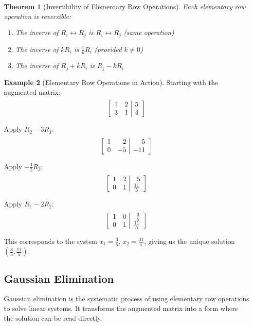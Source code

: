 \documentclass[12pt]{article}
\numberwithin{equation}{section}
\newenvironment{amatrix}[1]{%
  \left[\begin{array}{#1}}
  {\end{array}\right]}
\theoremstyle{plain}
\newtheorem{theorem}{Theorem}[section]
\theoremstyle{definition}
\newtheorem{example}[theorem]{Example}
\theoremstyle{remark}
\begin{document}
\begin{theorem}[Invertibility of Elementary Row Operations]
Each elementary row operation is reversible:
\begin{enumerate}
\item The inverse of $R_i \leftrightarrow R_j$ is $R_i \leftrightarrow R_j$ (same operation)
\item The inverse of $kR_i$ is $\frac{1}{k}R_i$ (provided $k \neq 0$)
\item The inverse of $R_j + kR_i$ is $R_j - kR_i$
\end{enumerate}
\end{theorem}

\begin{example}[Elementary Row Operations in Action]
Starting with the augmented matrix:
$$\begin{amatrix}{rr|r}
1 & 2 & 5\\
3 & 1 & 4
\end{amatrix}$$

Apply $R_2 - 3R_1$:
$$\begin{amatrix}{rr|r}
1 & 2 & 5\\
0 & -5 & -11
\end{amatrix}$$

Apply $-\frac{1}{5}R_2$:
$$\begin{amatrix}{rr|r}
1 & 2 & 5\\
0 & 1 & \frac{11}{5}
\end{amatrix}$$

Apply $R_1 - 2R_2$:
$$\begin{amatrix}{rr|r}
1 & 0 & \frac{3}{5}\\
0 & 1 & \frac{11}{5}
\end{amatrix}$$

This corresponds to the system $x_1 = \frac{3}{5}$, $x_2 = \frac{11}{5}$, giving us the unique solution $\left(\frac{3}{5}, \frac{11}{5}\right)$.
\end{example}

\subsection{Gaussian Elimination}

Gaussian elimination is the systematic process of using elementary row operations to solve linear systems. It transforms the augmented matrix into a form where the solution can be read directly.
\end{document}
